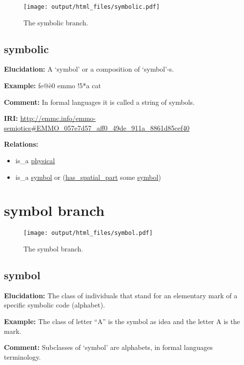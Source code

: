 \documentclass[a4paper,]{report}
\providecommand{\tightlist}{%
  \setlength{\itemsep}{0pt}\setlength{\parskip}{0pt}}
\begin{document}
\begin{figure}
\centering
\texttt{[image: output/html\_files/symbolic.pdf]}
\caption{The symbolic branch.}
\end{figure}

\hypertarget{symbolic}{%
\subsection{symbolic}\label{symbolic}}

\textbf{Elucidation:} A `symbol' or a composition of `symbol'-s.

\textbf{Example:} fe@è0 emmo !5*a cat

\textbf{Comment:} In formal languages it is called a string of symbols.

\textbf{IRI:}
\url{http://emmc.info/emmo-semiotics\#EMMO_057e7d57_aff0_49de_911a_8861d85cef40}

\textbf{Relations:}

\begin{itemize}
\tightlist
\item
  is\_a \protect\hyperlink{physical}{physical}
\item
  is\_a \protect\hyperlink{symbol}{symbol} or
  (\protect\hyperlink{has_spatial_part}{has\_spatial\_part} some
  \protect\hyperlink{symbol}{symbol})
\end{itemize}

\hypertarget{symbol-branch}{%
\section{symbol branch}\label{symbol-branch}}

\begin{figure}
\centering
\texttt{[image: output/html\_files/symbol.pdf]}
\caption{The symbol branch.}
\end{figure}

\hypertarget{symbol}{%
\subsection{symbol}\label{symbol}}

\textbf{Elucidation:} The class of individuals that stand for an
elementary mark of a specific symbolic code (alphabet).

\textbf{Example:} The class of letter ``A'' is the symbol as idea and
the letter A is the mark.

\textbf{Comment:} Subclasses of `symbol' are alphabets, in formal
languages terminology.
\end{document}
